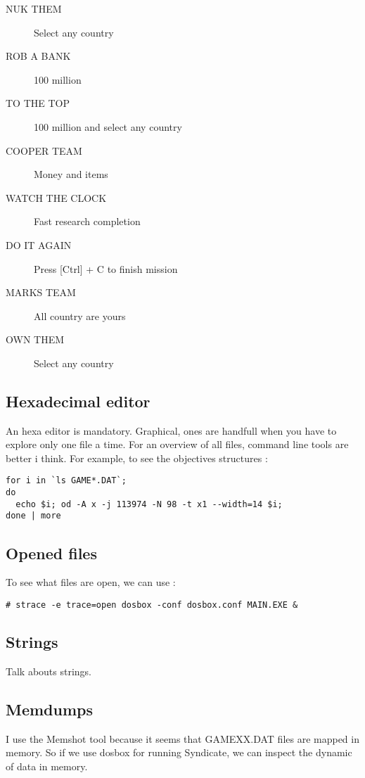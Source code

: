 \documentclass[a4paper,twoside,12pt,dvips]{article}
\begin{document}
\begin{description}
\item[NUK THEM] Select any country
\item[ROB A BANK] 100 million
\item[TO THE TOP] 100 million and select any country
\item[COOPER TEAM] Money and items
\item[WATCH THE CLOCK] Fast research completion
\item[DO IT AGAIN] Press [Ctrl] + C to finish mission
\item[MARKS TEAM] All country are yours
\item[OWN THEM] Select any country
\end{description}

\subsection{Hexadecimal editor}
\label{sec:hexed}

An hexa editor is mandatory. Graphical, ones are handfull when you have to explore only one file a time. For an overview of all files, command line tools are better i think. For example, to see the objectives structures :
\begin{lstlisting}
for i in `ls GAME*.DAT`;
do 
  echo $i; od -A x -j 113974 -N 98 -t x1 --width=14 $i; 
done | more
\end{lstlisting}

\subsection{Opened files}
\label{sec:opfiles}

To see what files are open, we can use :
\begin{lstlisting}
# strace -e trace=open dosbox -conf dosbox.conf MAIN.EXE &
\end{lstlisting}

\subsection{Strings}
\label{sec:strings}

Talk abouts strings.

\subsection{Memdumps}
\label{sec:memdumps}

I use the Memshot tool because it seems that GAMEXX.DAT files are mapped in memory. So if we use dosbox for running Syndicate, we can inspect the dynamic of data in memory.
\end{document}
